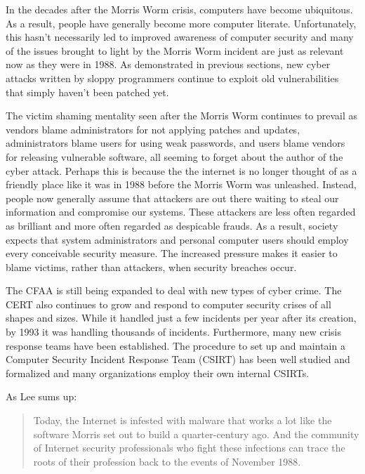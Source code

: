In the decades after the Morris Worm crisis, computers have become ubiquitous.
As a result, people have generally become more computer literate. Unfortunately,
this hasn't necessarily led to improved awareness of computer security and many of the
issues brought to light by the Morris Worm incident are just as relevant now as
they were in 1988. As demonstrated in previous sections, new cyber attacks
written by sloppy programmers continue to exploit old vulnerabilities that
simply haven't been patched yet.

The victim shaming mentality seen after the Morris Worm continues
to prevail as vendors blame administrators for not applying patches and
updates, administrators blame users for using weak passwords, and users blame
vendors for releasing vulnerable software, all seeming to forget about the
author of the cyber attack. Perhaps this is because the the internet is no longer
thought of as a friendly place like it was in 1988 before the Morris Worm was
unleashed. Instead, people now generally assume that attackers are out there
waiting to steal our information and compromise our systems.
These attackers are less often regarded as brilliant and more often
regarded as despicable frauds. As a
result, society expects that system administrators and personal computer users
should employ every conceivable security measure. The increased pressure makes
it easier to blame victims, rather than attackers, when security
breaches occur.

The CFAA is still being expanded to deal with new types of cyber
crime\cite{adams_controlling_1996}. The CERT also continues to grow and respond
to computer security crises of all shapes and sizes. While it handled just a
few incidents per year after its creation, by 1993 it was handling thousands of
incidents\cite{fithen_cert_1994}. Furthermore, many new crisis response teams
have been established. The procedure to set up and maintain a Computer Security
Incident Response Team (CSIRT) has been well studied and formalized and many
organizations employ their own internal CSIRTs.

As Lee\cite{lee_washpost_2013} sums up:
\begin{quote}
Today, the Internet is infested with malware that works a lot like the software
Morris set out to build a quarter-century ago. And the community of Internet
security professionals who fight these infections can trace the roots of their
profession back to the events of November 1988.
\end{quote}
